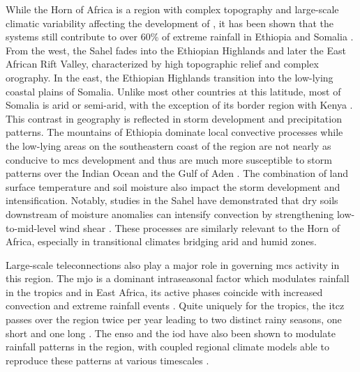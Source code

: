 While the Horn of Africa is a region with complex topography and large-scale climatic variability affecting the development of , it has been shown that the systems still contribute to over 60\% of extreme rainfall in Ethiopia and Somalia \citep{Hill2023}. From the west, the Sahel fades into the Ethiopian Highlands and later the East African Rift Valley, characterized by high topographic relief and complex orography. In the east, the Ethiopian Highlands transition into the low-lying coastal plains of Somalia. Unlike most other countries at this latitude, most of Somalia is arid or semi-arid, with the exception of its border region with Kenya \citep{Beck2023}. This contrast in geography is reflected in storm development and precipitation patterns. The mountains of Ethiopia dominate local convective processes \citep{Negash2024} while the low-lying areas on the southeastern coast of the region are not nearly as conducive to \acrshort{mcs} development and thus are much more susceptible to storm patterns over the Indian Ocean and the Gulf of Aden \citep{Camberlin2024}. The combination of land surface temperature and soil moisture also impact the storm development and intensification. Notably, studies in the Sahel have demonstrated that dry soils downstream of moisture anomalies can intensify convection by strengthening low-to-mid-level wind shear \citep{Klein2020,Taylor2017}. These processes are similarly relevant to the Horn of Africa, especially in transitional climates bridging arid and humid zones.

Large-scale \glspl{teleconnection} also play a major role in governing \acrshort{mcs} activity in this region. The \acrfull{mjo} is a dominant intraseasonal factor which modulates rainfall in the tropics and in East Africa, its active phases coincide with increased convection and extreme rainfall events \citep{Pohl2006,Ochieng2023}. Quite uniquely for the tropics, the \acrfull{itcz} passes over the region twice per year leading to two distinct rainy seasons, one short and one long \citep{Palmer2023,Tefera2025}. The \acrfull{enso} and the \acrfull{iod} have also been shown to modulate rainfall patterns in the region, with coupled regional climate models able to reproduce these patterns at various timescales \citep{Vashisht2021,Dubache2019,Endris2019}.

